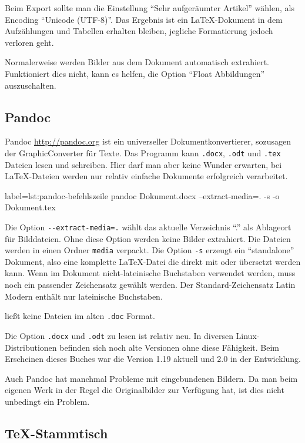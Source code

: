 {Beim Export sollte man die Einstellung \enquote{Sehr aufgeräumter Artikel}
wählen, als Encoding \enquote{Unicode (UTF-8)}.  Das Ergebnis ist ein
\LaTeX{}-Dokument in dem Aufzählungen und Tabellen erhalten bleiben,
jegliche Formatierung jedoch verloren geht.

Normalerweise werden Bilder aus dem Dokument automatisch extrahiert.
Funktioniert dies nicht, kann es helfen, die Option \enquote{Float Abbildungen} auszuschalten.

\subsection{Pandoc}

Pandoc \url{http://pandoc.org} ist ein universeller Dokumentkonvertierer, sozusagen der GraphicConverter für Texte.
Das Programm kann \texttt{.docx}, \texttt{.odt} und \texttt{.tex} Dateien lesen und schreiben.
Hier darf man aber keine Wunder erwarten, bei \LaTeX{}-Dateien werden nur relativ einfache Dokumente erfolgreich verarbeitet.

\begin{lfgwcode}{label={lst:pandoc-befehlszeile}}
pandoc Dokument.docx --extract-media=. -s -o Dokument.tex
\end{lfgwcode}

Die Option \texttt{-{}-extract-media=.} wählt das aktuelle Verzeichnis \enquote{.} als Ablageort für Bilddateien.
Ohne diese Option werden keine Bilder extrahiert.
Die Dateien werden in einen Ordner \texttt{media} verpackt.
Die Option \texttt{-s} erzeugt ein \enquote{standalone} Dokument, also eine komplette \LaTeX{}-Datei die direkt
mit  oder  übersetzt werden kann.
Wenn im Dokument nicht-lateinische Buchstaben verwendet werden, muss noch ein passender Zeichensatz gewählt werden.
Der Standard-Zeichensatz Latin Modern enthält nur lateinische Buchstaben.

 ließt keine Dateien im alten \texttt{.doc} Format.

Die Option \texttt{.docx} und \texttt{.odt} zu lesen ist relativ neu.
In diversen Linux-Distributionen befinden sich noch alte Versionen ohne diese Fähigkeit.
Beim Erscheinen dieses Buches war die Version 1.19 aktuell und 2.0 in der Entwicklung.

Auch Pandoc hat manchmal Probleme mit eingebundenen Bildern.
Da man beim eigenen Werk in der Regel die Originalbilder zur Verfügung hat, ist dies nicht unbedingt ein Problem.

\subsection{\TeX{}-Stammtisch}

}

